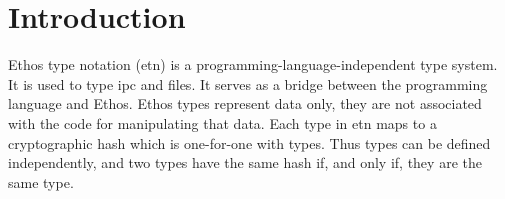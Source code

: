 \section{Introduction}
Ethos type notation (etn) is a programming-language-independent type system. It is used to type ipc and files. It serves as a bridge between the programming language and Ethos. Ethos types represent data only, they are not associated with the code for manipulating that data.
Each type in etn maps to a cryptographic hash which is one-for-one with types. Thus types can be defined independently, and two types have the same hash if, and only if, they are the same type.